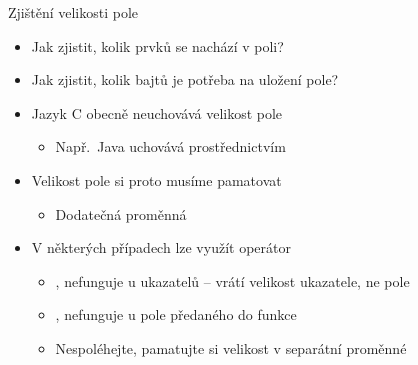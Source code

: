 \begin{frame}{Zjištění velikosti pole}

  \begin{itemize}
    \item Jak zjistit, kolik prvků se nachází v poli?
    \item Jak zjistit, kolik bajtů je potřeba na uložení pole?

    \pause

    \item Jazyk C obecně neuchovává velikost pole
    \begin{itemize}
      \item Např.\ Java uchovává prostřednictvím 
    \end{itemize}

    \pause

    \item Velikost pole si proto musíme pamatovat
    \begin{itemize}
      \item Dodatečná proměnná
    \end{itemize}

    \pause

    \item V některých případech lze využít operátor 
    \begin{itemize}
      \item \pozor, nefunguje u ukazatelů -- vrátí velikost ukazatele, ne pole

      \pause

      \item \pozor, nefunguje u pole předaného do funkce

      \pause

      \item Nespoléhejte, pamatujte si velikost v separátní proměnné
    \end{itemize}
  \end{itemize}

\end{frame}

